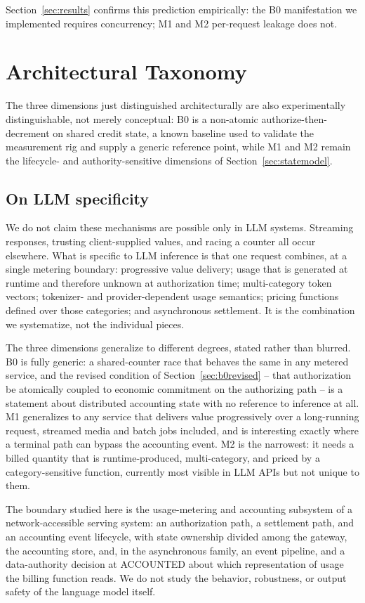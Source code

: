 \documentclass[manuscript,review]{acmart}
\begin{document}
Section~\ref{sec:results} confirms this prediction empirically: the B0 manifestation we
implemented requires concurrency; M1 and M2 per-request leakage does not.

\section{Architectural Taxonomy}
\label{sec:taxonomy}
The three dimensions just distinguished architecturally are also experimentally
distinguishable, not merely conceptual: B0 is a non-atomic authorize-then-decrement on
shared credit state, a known baseline used to validate the measurement rig and supply a
generic reference point, while M1 and M2 remain the lifecycle- and authority-sensitive
dimensions of Section~\ref{sec:statemodel}.

\subsection{On LLM specificity}
We do not claim these mechanisms are possible only in LLM systems. Streaming responses,
trusting client-supplied values, and racing a counter all occur elsewhere. What is
specific to LLM inference is that one request combines, at a single metering boundary:
progressive value delivery; usage that is generated at runtime and therefore unknown at
authorization time; multi-category token vectors; tokenizer- and provider-dependent usage
semantics; pricing functions defined over those categories; and asynchronous settlement.
It is the combination we systematize, not the individual pieces.

The three dimensions generalize to different degrees, stated rather than blurred. B0 is
fully generic: a shared-counter race that behaves the same in any metered service, and
the revised condition of Section~\ref{sec:b0revised} -- that authorization be atomically
coupled to economic commitment on the authorizing path -- is a statement about
distributed accounting state with no reference to inference at all. M1 generalizes to any
service that delivers value progressively over a long-running request, streamed media and
batch jobs included, and is interesting exactly where a terminal path can bypass the
accounting event. M2 is the narrowest: it needs a billed quantity that is
runtime-produced, multi-category, and priced by a category-sensitive function, currently
most visible in LLM APIs but not unique to them.

The boundary studied here is the usage-metering and accounting subsystem of a
network-accessible serving system: an authorization path, a settlement path, and an
accounting event lifecycle, with state ownership divided among the gateway, the
accounting store, and, in the asynchronous family, an event pipeline, and a
data-authority decision at ACCOUNTED about which representation of usage the billing
function reads. We do not study the behavior, robustness, or output safety of the
language model itself.
\end{document}
